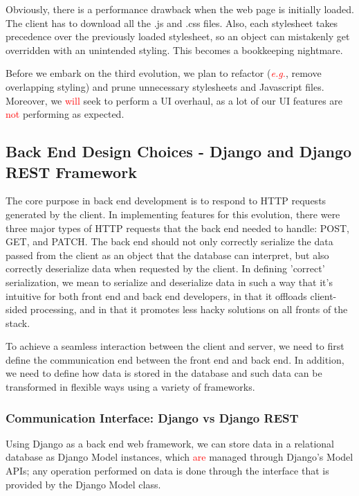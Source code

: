 \documentclass[a4paper]{article}
\newcommand{\comment}[1]{\textcolor{red}{#1}}
\begin{document}
Obviously, there is a performance drawback when the web page is initially loaded. The client has to download all the .js and .css files. Also, each stylesheet takes precedence over the previously loaded stylesheet, so an object can mistakenly get overridden with an unintended styling. This becomes a bookkeeping nightmare.

Before we embark on the third evolution, we plan to refactor (\comment{\emph{e.g.}}, remove overlapping styling) and prune unnecessary stylesheets and Javascript files. Moreover, we \comment{will} seek to perform a UI overhaul, as a lot of our UI features are \comment{not} performing as expected.

\subsection{Back End Design Choices - Django and Django REST Framework}

The core purpose in back end development is to respond to HTTP requests generated by the client. In implementing features for this evolution, there were three major types of HTTP requests that the back end needed to handle: POST, GET, and PATCH. The back end should not only correctly serialize the data passed from the client as an object that the database can interpret, but also correctly deserialize data when requested by the client. In defining 'correct' serialization, we mean to serialize and deserialize data in such a way that it's intuitive for both front end and back end developers, in that it offloads client-sided processing, and in that it promotes less hacky solutions on all fronts of the stack.

To achieve a seamless interaction between the client and server, we need to first define the communication end between the front end and back end. In addition, we need to define how data is stored in the database and such data can be transformed in flexible ways using a variety of frameworks.

\subsubsection{Communication Interface: Django vs Django REST}

Using Django as a back end web framework, we can store data in a relational database as Django Model instances, which \comment{are} managed through Django's Model APIs; any operation performed on data is done through the interface that is provided by the Django Model class. 
 
\end{document}
